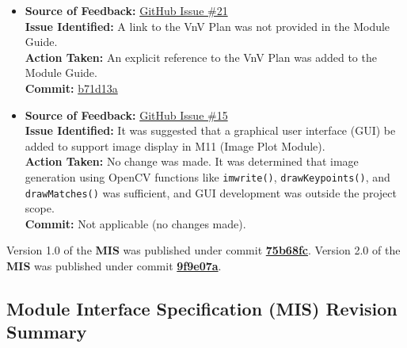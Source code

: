 \documentclass{article}
\begin{document}
\begin{itemize}
  \item \textbf{Source of Feedback:} \href{https://github.com/KiranSingh15/CAS-741-Image-Correspondences/issues/21}{GitHub Issue \#21} \\
  \textbf{Issue Identified:} A link to the VnV Plan was not provided in the Module Guide. \\
  \textbf{Action Taken:} An explicit reference to the VnV Plan was added to the Module Guide. \\
  \textbf{Commit:} \href{https://github.com/KiranSingh15/CAS-741-Image-Correspondences/commit/b71d13a22a609f3a48efb7fa22a8fe5f681868c5}{b71d13a}

  \item \textbf{Source of Feedback:} \href{https://github.com/KiranSingh15/CAS-741-Image-Correspondences/issues/15}{GitHub Issue \#15} \\
  \textbf{Issue Identified:} It was suggested that a graphical user interface (GUI) be added to support image display in M11 (Image Plot Module). \\
  \textbf{Action Taken:} No change was made. It was determined that image generation using OpenCV functions like \texttt{imwrite()}, \texttt{drawKeypoints()}, and \texttt{drawMatches()} was sufficient, and GUI development was outside the project scope. \\
  \textbf{Commit:} Not applicable (no changes made).

\end{itemize}

\noindent Version 1.0 of the \textbf{MIS} was published under commit \href{https://github.com/KiranSingh15/CAS-741-Image-Correspondences/commit/75b68fcefe01cadebe7cf7eaae0b135417635167}{\textbf{75b68fc}}. Version 2.0 of the \textbf{MIS} was published under commit \href{https://github.com/KiranSingh15/CAS-741-Image-Correspondences/commit/9f9e07a572e2f0db97f3e057f998ba9bad0d9189}{\textbf{9f9e07a}}.

\subsection*{Module Interface Specification (MIS) Revision Summary}
\end{document}
